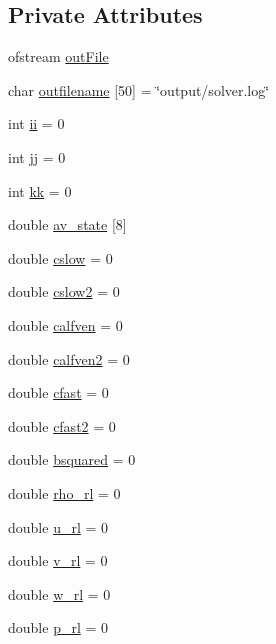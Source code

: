 \subsection*{Private Attributes}
\begin{DoxyCompactItemize}
\item 
ofstream \hyperlink{classRiemann_a9656634a42300884c7f97b4ca5bd3645}{out\+File}
\item 
char \hyperlink{classRiemann_a80144acbc28f1d38e813f3912bf2e336}{outfilename} \mbox{[}50\mbox{]} = \char`\"{}output/solver.\+log\char`\"{}
\item 
int \hyperlink{classRiemann_a2cebab2f34878e07cbf609a6528aea88}{ii} = 0
\item 
int \hyperlink{classRiemann_a704fc2f4433b345feef019aa74a9e6d9}{jj} = 0
\item 
int \hyperlink{classRiemann_ad155872df64f6464e75672b0fd263f94}{kk} = 0
\item 
double \hyperlink{classRiemann_abd51303fe8ed0c0b4585ad25d1cced84}{av\+\_\+state} \mbox{[}8\mbox{]}
\item 
double \hyperlink{classRiemann_a98036eb3323318e58411037d55097c4a}{cslow} = 0
\item 
double \hyperlink{classRiemann_a52b1266fdc1e91bcb49dbbef307ab885}{cslow2} = 0
\item 
double \hyperlink{classRiemann_a7f09440591b61458a2b03db835557fc3}{calfven} = 0
\item 
double \hyperlink{classRiemann_a469ea9321f7b885685611aeaef06858b}{calfven2} = 0
\item 
double \hyperlink{classRiemann_a17e6848dda93ccb5330f94ca46e386b8}{cfast} = 0
\item 
double \hyperlink{classRiemann_ab6927a0076cd1a7ba710310364b92a1b}{cfast2} = 0
\item 
double \hyperlink{classRiemann_aeda4880984271a0847725c2aec01b496}{bsquared} = 0
\item 
double \hyperlink{classRiemann_a16fcc1621ba3949c6541fc7c42d3af7f}{rho\+\_\+rl} = 0
\item 
double \hyperlink{classRiemann_a44cf94d6988534e5e05bf34b52800553}{u\+\_\+rl} = 0
\item 
double \hyperlink{classRiemann_a1770759fdc03b69a3f7ffd53d325db74}{v\+\_\+rl} = 0
\item 
double \hyperlink{classRiemann_a0c306a29f08c6eb4814723fb2778224c}{w\+\_\+rl} = 0
\item 
double \hyperlink{classRiemann_acc72f10af19015784ef3b24b4f816651}{p\+\_\+rl} = 0
\item 

\end{DoxyCompactItemize}
